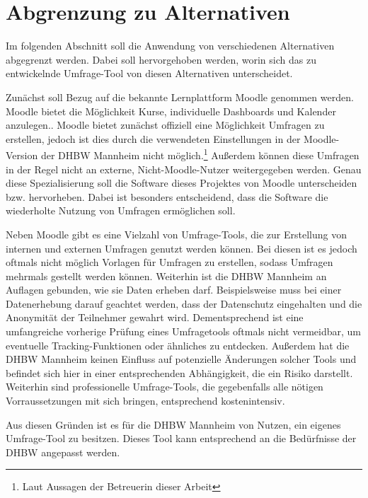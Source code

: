 \section{Abgrenzung zu Alternativen}
\label{sec:AbgrenzungZuAlternativen}

Im folgenden Abschnitt soll die Anwendung von verschiedenen Alternativen abgegrenzt werden.
Dabei soll hervorgehoben werden, worin sich das zu entwickelnde Umfrage-Tool von diesen Alternativen unterscheidet.

Zunächst soll Bezug auf die bekannte Lernplattform Moodle genommen werden.
Moodle bietet die Möglichkeit Kurse, individuelle Dashboards und Kalender anzulegen.\autocite[Vgl.][]{ms-moodle-features}.
Moodle bietet zunächst offiziell eine Möglichkeit Umfragen zu erstellen, jedoch ist dies durch die verwendeten Einstellungen in der Moodle-Version der \acs{DHBW} Mannheim nicht möglich.\footnote{Laut Aussagen der Betreuerin dieser Arbeit}
Außerdem können diese Umfragen in der Regel nicht an externe, Nicht-Moodle-Nutzer weitergegeben werden.
Genau diese Spezialisierung soll die Software dieses Projektes von Moodle unterscheiden bzw. hervorheben.
Dabei ist besonders entscheidend, dass die Software die wiederholte Nutzung von Umfragen ermöglichen soll.

Neben Moodle gibt es eine Vielzahl von Umfrage-Tools, die zur Erstellung von internen und externen Umfragen genutzt werden können.
Bei diesen ist es jedoch oftmals nicht möglich Vorlagen für Umfragen zu erstellen, sodass Umfragen mehrmals gestellt werden können.
Weiterhin ist die \acs{DHBW} Mannheim an Auflagen gebunden, wie sie Daten erheben darf.
Beispielsweise muss bei einer Datenerhebung darauf geachtet werden, dass der Datenschutz eingehalten und die Anonymität der Teilnehmer gewahrt wird.
Dementsprechend ist eine umfangreiche vorherige Prüfung eines Umfragetools oftmals nicht vermeidbar, um eventuelle Tracking-Funktionen oder ähnliches zu entdecken.
Außerdem hat die \acs{DHBW} Mannheim keinen Einfluss auf potenzielle Änderungen solcher Tools und befindet sich hier in einer entsprechenden Abhängigkeit, die ein Risiko darstellt.
Weiterhin sind professionelle Umfrage-Tools, die gegebenfalls alle nötigen Vorraussetzungen mit sich bringen, entsprechend kostenintensiv.

Aus diesen Gründen ist es für die \acs{DHBW} Mannheim von Nutzen, ein eigenes Umfrage-Tool zu besitzen.
Dieses Tool kann entsprechend an die Bedürfnisse der \acs{DHBW} angepasst werden.
